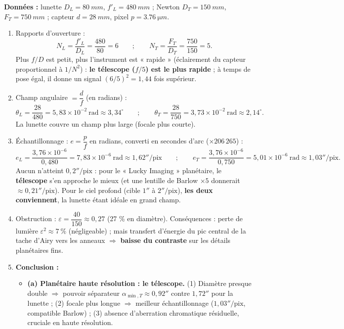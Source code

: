\documentclass[11pt]{article}
\begin{document}
\begin{corrige}
\textbf{Données :} lunette $D_L = \SI{80}{mm}$, $f'_L = \SI{480}{mm}$ ; Newton $D_T = \SI{150}{mm}$, $F_T = \SI{750}{mm}$ ; capteur $d = \SI{28}{mm}$, pixel $p = \SI{3,76}{\micro m}$.
\begin{enumerate}
    \item Rapports d'ouverture :
    \[ N_L = \frac{f'_L}{D_L} = \frac{480}{80} = 6 \qquad ; \qquad N_T = \frac{F_T}{D_T} = \frac{750}{150} = 5. \]
    Plus $f/D$ est petit, plus l'instrument est « rapide » (éclairement du capteur proportionnel à $1/N^2$) : \textbf{le télescope ($f/5$) est le plus rapide} ; à temps de pose égal, il donne un signal $(6/5)^2 = 1,44$ fois supérieur.
    \item Champ angulaire $= \dfrac{d}{f}$ (en radians) :
    \[ \theta_L = \frac{28}{480} = 5,83\times10^{-2}\ \text{rad} \approx 3,34^\circ \qquad ; \qquad \theta_T = \frac{28}{750} = 3,73\times10^{-2}\ \text{rad} \approx 2,14^\circ. \]
    La lunette couvre un champ plus large (focale plus courte).
    \item Échantillonnage : $e = \dfrac{p}{f}$ en radians, converti en secondes d'arc ($\times 206\,265$) :
    \[ e_L = \frac{3,76\times10^{-6}}{0,480} = 7,83\times10^{-6}\ \text{rad} \approx 1,62''/\text{pix} \qquad ; \qquad e_T = \frac{3,76\times10^{-6}}{0,750} = 5,01\times10^{-6}\ \text{rad} \approx 1,03''/\text{pix}. \]
    Aucun n'atteint $0,2''/\text{pix}$ : pour le « Lucky Imaging » planétaire, le \textbf{télescope} s'en approche le mieux (et une lentille de Barlow $\times 5$ donnerait $\approx 0,21''/\text{pix}$). Pour le ciel profond (cible $1''$ à $2''/\text{pix}$), \textbf{les deux conviennent}, la lunette étant idéale en grand champ.
    \item Obstruction : $\varepsilon = \dfrac{40}{150} \approx 0,27$ (27 \% en diamètre). Conséquences : perte de lumière $\varepsilon^2 \approx 7\ \%$ (négligeable) ; mais transfert d'énergie du pic central de la tache d'Airy vers les anneaux $\Rightarrow$ \textbf{baisse du contraste} sur les détails planétaires fins.
    \item \textbf{Conclusion :}
    \begin{itemize}
        \item \textbf{(a) Planétaire haute résolution : le télescope.} (1) Diamètre presque double $\Rightarrow$ pouvoir séparateur $\alpha_{\min,T} \approx 0,92''$ contre $1,72''$ pour la lunette ; (2) focale plus longue $\Rightarrow$ meilleur échantillonnage ($1,03''/\text{pix}$, compatible Barlow) ; (3) absence d'aberration chromatique résiduelle, cruciale en haute résolution.

\end{itemize}
\end{enumerate}
\end{corrige}
\end{document}
